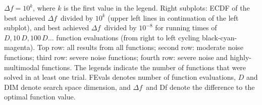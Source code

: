 \documentclass{sig-alternate}
\newcommand{\Df}{\ensuremath{\Delta f}}
\begin{document}
\begin{figure*}
{ $\Df=10^{k}$, where $k$ is the first value in the legend. Right subplots: ECDF of the best achieved \Df\ divided by $10^k$ (upper left
 lines in continuation of the left subplot), and best achieved \Df\
 divided by $10^{-8}$ for running times of $D, 10\,D,
 100\,D\dots$ function evaluations (from right
 to left cycling black-cyan-magenta).
 Top row: all results from all functions; second row: moderate noise
 functions; third row: severe noise functions; fourth row: severe noise
 and highly-multimodal functions.
 The legends indicate the number of functions that were solved in at
 least one trial. FEvals denotes number of function evaluations,
 $D$ and \textsf{DIM} denote search space dimension, and \Df\ and \textsf{Df} denote the difference to the optimal function value. }
\end{figure*}

%

%
%
\end{document}
